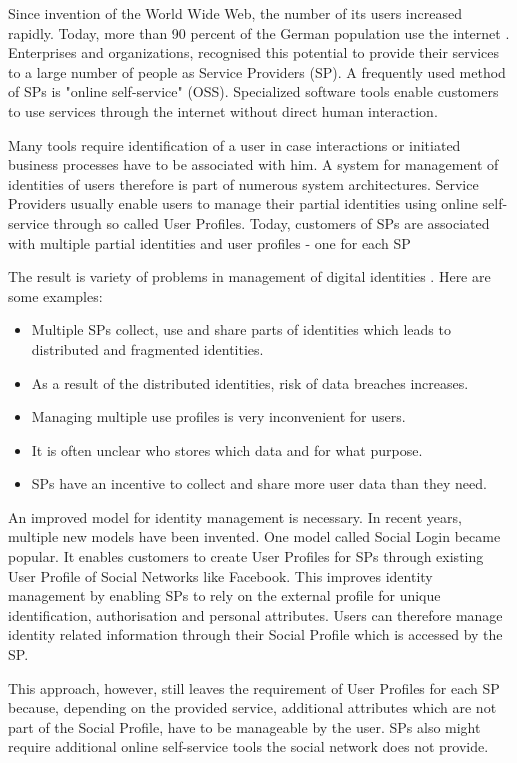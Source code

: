 Since invention of the World Wide Web, the number of its users increased rapidly. Today, more than 90 percent of the German population use the internet \cite{Onlinestudie}. Enterprises and organizations, recognised this potential to provide their services to a large number of people as Service Providers (SP). A frequently used method of SPs is "online self-service" (OSS). Specialized software tools enable customers to use services through the internet without direct human interaction.

Many tools require identification of a user in case interactions or initiated business processes have to be associated with him. A system for management of identities of users therefore is part of numerous system architectures. Service Providers usually enable users to manage their partial identities using online self-service through so called User Profiles. Today, customers of SPs are associated with multiple partial identities and user profiles - one for each SP

The result is variety of problems in management of digital identities \cite{IdentityCrisis}. Here are some examples:
\begin{itemize}
    \item Multiple SPs collect, use and share parts of identities which leads to distributed and fragmented identities.
    \item As a result of the distributed identities, risk of data breaches increases.
    \item Managing multiple use profiles is very inconvenient for users.
    \item It is often unclear who stores which data and for what purpose.
    \item SPs have an incentive to collect and share more user data than they need.
\end{itemize}

An improved model for identity management is necessary. In recent years, multiple new models have been invented. One model called Social Login became popular. It enables customers to create User Profiles for SPs through existing User Profile of Social Networks like Facebook. This improves identity management by enabling SPs to rely on the external profile for unique identification, authorisation and personal attributes. Users can therefore manage identity related information through their Social Profile which is accessed by the SP.

This approach, however, still leaves the requirement of User Profiles for each SP because, depending on the provided service, additional attributes which are not part of the Social Profile, have to be manageable by the user. SPs also might require additional online self-service tools the social network does not provide.

